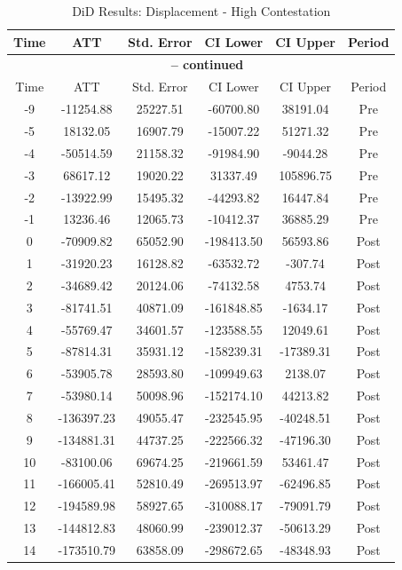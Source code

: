 \documentclass[bibtex]{article}
\begin{document}
{\begin{longtable}{cccccc}
\caption{DiD Results: Displacement - High Contestation} \label{tab:idp_high} \\
\toprule
Time & ATT & Std. Error & CI Lower & CI Upper & Period \\
\midrule
\endfirsthead
\multicolumn{6}{c}{{\bfseries \tablename\ \thetable{} -- continued}} \\
\toprule
Time & ATT & Std. Error & CI Lower & CI Upper & Period \\
\midrule
\endhead
-9 & -11254.88 & 25227.51 & -60700.80 & 38191.04 & Pre \\
-5 & 18132.05 & 16907.79 & -15007.22 & 51271.32 & Pre \\
-4 & -50514.59 & 21158.32 & -91984.90 & -9044.28 & Pre \\
-3 & 68617.12 & 19020.22 & 31337.49 & 105896.75 & Pre \\
-2 & -13922.99 & 15495.32 & -44293.82 & 16447.84 & Pre \\
-1 & 13236.46 & 12065.73 & -10412.37 & 36885.29 & Pre \\
0 & -70909.82 & 65052.90 & -198413.50 & 56593.86 & Post \\
1 & -31920.23 & 16128.82 & -63532.72 & -307.74 & Post \\
2 & -34689.42 & 20124.06 & -74132.58 & 4753.74 & Post \\
3 & -81741.51 & 40871.09 & -161848.85 & -1634.17 & Post \\
4 & -55769.47 & 34601.57 & -123588.55 & 12049.61 & Post \\
5 & -87814.31 & 35931.12 & -158239.31 & -17389.31 & Post \\
6 & -53905.78 & 28593.80 & -109949.63 & 2138.07 & Post \\
7 & -53980.14 & 50098.96 & -152174.10 & 44213.82 & Post \\
8 & -136397.23 & 49055.47 & -232545.95 & -40248.51 & Post \\
9 & -134881.31 & 44737.25 & -222566.32 & -47196.30 & Post \\
10 & -83100.06 & 69674.25 & -219661.59 & 53461.47 & Post \\
11 & -166005.41 & 52810.49 & -269513.97 & -62496.85 & Post \\
12 & -194589.98 & 58927.65 & -310088.17 & -79091.79 & Post \\
13 & -144812.83 & 48060.99 & -239012.37 & -50613.29 & Post \\
14 & -173510.79 & 63858.09 & -298672.65 & -48348.93 & Post \\

\end{longtable}}
\end{document}
